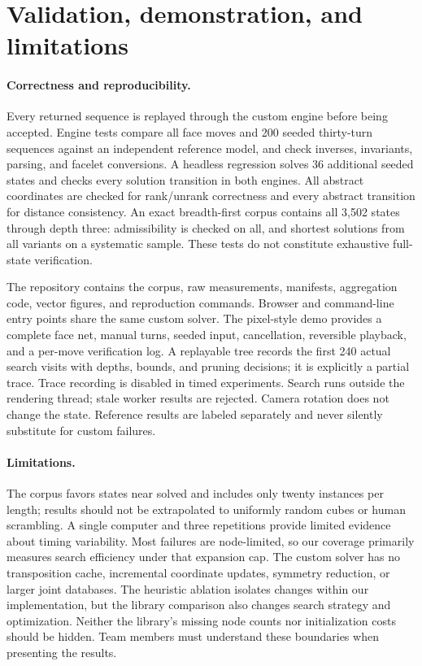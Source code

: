 \documentclass{article}
\begin{document}
\section{Validation, demonstration, and limitations}
\paragraph{Correctness and reproducibility.}
Every returned sequence is replayed through the custom engine before being accepted. Engine tests compare all face moves and 200 seeded thirty-turn sequences against an independent reference model, and check inverses, invariants, parsing, and facelet conversions. A headless regression solves 36 additional seeded states and checks every solution transition in both engines. All abstract coordinates are checked for rank/unrank correctness and every abstract transition for distance consistency. An exact breadth-first corpus contains all 3,502 states through depth three: admissibility is checked on all, and shortest solutions from all variants on a systematic sample. These tests do not constitute exhaustive full-state verification.

The repository contains the corpus, raw measurements, manifests, aggregation code, vector figures, and reproduction commands. Browser and command-line entry points share the same custom solver. The pixel-style demo provides a complete face net, manual turns, seeded input, cancellation, reversible playback, and a per-move verification log. A replayable tree records the first 240 actual search visits with depths, bounds, and pruning decisions; it is explicitly a partial trace. Trace recording is disabled in timed experiments. Search runs outside the rendering thread; stale worker results are rejected. Camera rotation does not change the state. Reference results are labeled separately and never silently substitute for custom failures.

\paragraph{Limitations.}
The corpus favors states near solved and includes only twenty instances per length; results should not be extrapolated to uniformly random cubes or human scrambling. A single computer and three repetitions provide limited evidence about timing variability. Most failures are node-limited, so our coverage primarily measures search efficiency under that expansion cap. The custom solver has no transposition cache, incremental coordinate updates, symmetry reduction, or larger joint databases. The heuristic ablation isolates changes within our implementation, but the library comparison also changes search strategy and optimization. Neither the library's missing node counts nor initialization costs should be hidden. Team members must understand these boundaries when presenting the results.
\end{document}
